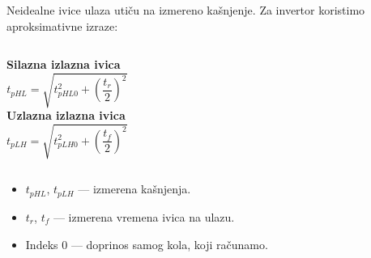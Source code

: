 \begin{frame}[label=08-s038]
Neidealne ivice ulaza utiču na izmereno kašnjenje. Za invertor koristimo aproksimativne izraze:\par\medskip
\begin{columns}[T,onlytextwidth]
\textbf{Silazna izlazna ivica}
\[t_{pHL}=\sqrt{t_{pHL0}^{2}+\left(\frac{t_r}2\right)^2}\]
\textbf{Uzlazna izlazna ivica}
\[t_{pLH}=\sqrt{t_{pLH0}^{2}+\left(\frac{t_f}2\right)^2}\]
\end{columns}\medskip
\begin{itemize}
\item $t_{pHL}$, $t_{pLH}$ — izmerena kašnjenja.
\item $t_r$, $t_f$ — izmerena vremena ivica na ulazu.
\item Indeks $0$ — doprinos samog kola, koji računamo.
\end{itemize}
\end{frame}
